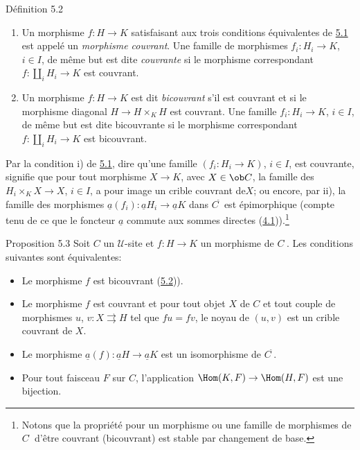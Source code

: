 \begin{enonce*}{Définition 5.2}
\begin{enumerate}
\renewcommand{\labelenumi}{\theenumi)}
\item Un morphisme $f:H\rightarrow K$ satisfaisant aux trois
  conditions équivalentes de \hyperref[II.prop5.1]{5.1} est appelé un \emph{morphisme
  couvrant}. Une famille de morphismes $f_i:H_i\rightarrow K$, $i\in
  I$, de même but est dite \emph{couvrante} si le morphisme correspondant
  $f:\amalg_i H_i\rightarrow K$ est couvrant.

\item Un morphisme $f:H\rightarrow K$ est dit \emph{bicouvrant} s'il est
  couvrant et si le morphisme diagonal $H\rightarrow H\times_K H$ est
  couvrant. Une famille $f_i:H_i\rightarrow K$, $i\in I$, de même
  but est dite bicouvrante si le morphisme correspondant $f:\amalg_i
  H_i\rightarrow K$ est bicouvrant.
\end{enumerate}
\end{enonce*}

Par la condition i) de \hyperref[II.prop5.1]{5.1}, dire qu'une famille
$(f_i:H_i\rightarrow K)$, $i\in I$, est couvrante, signifie que pour
tout morphisme $X\rightarrow K$, avec $X\in \ob C$, la famille des
$H_i\times_K X\rightarrow X$, $i\in I$, a pour image un crible
couvrant de\pageoriginale $X$; ou encore, par ii), la famille des
morphismes $\underline{a}(f_i):\underline{a}H_i\rightarrow \underline{a}K$ dans
$C^{\widetilde{\phantom{,}}}$ est épimorphique (compte tenu de ce
que le foncteur $\underline{a}$ commute aux sommes directes
(\hyperref[II.theo4.1]{4.1})).\footnote[1]{Notons que la propriété pour un
morphisme ou
  une famille de morphismes de $C^{\widehat{\phantom{,}}}$ d'être
  couvrant (\resp bicouvrant) est stable par changement de base.}

\begin{enonce*}{Proposition 5.3}
Soit $C$ un $𝒰$-site et $f:H\rightarrow K$ un morphisme de
$C^{\widehat{\phantom{,}}}$. Les conditions suivantes sont
équivalentes:
\begin{itemize}
\item[i)] Le morphisme $f$ est bicouvrant (\hyperref[II.def5.2]{5.2})).

\item[i bis)] Le morphisme $f$ est couvrant et pour tout objet $X$ de
  $C$ et tout couple de morphismes $u$, $v:X\rightrightarrows H$ tel
  que $fu=fv$, le noyau de $(u,v)$ est un crible couvrant de $X$.

\item[ii)] Le morphisme $\underline{a}(f):\underline{a}H\to \underline{a}K$ est un
  isomorphisme
  de $C^{\widetilde{\phantom{,}}}$.

\item[ii bis)] Pour tout faisceau $F$ sur $C$, l'application
  $\Hom(K,F)\rightarrow \Hom(H,F)$ est une bijection.
\end{itemize}
\end{enonce*}

